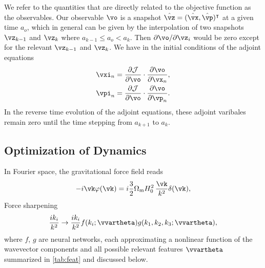 \documentclass[modern, trackchanges, dvipsnames]{aastex631}
\newcommand{\p}{\partial}
\newcommand{\cJ}{\mathcal{J}}
\newcommand{\Omegam}{\Omega_\mathrm{m}}
\begin{document}
We refer to the quantities that are directly related to the objective function
as the observables.
Our observable $\vo$ is a snapshot $\hat\vz = (\hat\vx,
\hat\vp)^\intercal$ at a given time $a_o$, which in general can be given by the
interpolation of two snapshots $\vz_{k-1}$ and $\vz_k$ where $a_{k-1} \leq a_o <
a_k$.
Then ${\p\vo}/{\p\vz_i}$ would be zero except for the relevant $\vz_{k-1}$
and $\vz_k$. We have in the initial conditions of the adjoint equations
\begin{align}
  \vxi_n &= \frac{\p\cJ}{\p\vo} \cdot \frac{\p\vo}{\p\vx_n}, \nonumber\\
  \vpi_n &= \frac{\p\cJ}{\p\vo} \cdot \frac{\p\vo}{\p\vp_n}.
\end{align}
In the reverse time evolution of the adjoint equations, these adjoint varibales
remain zero until the time stepping from $a_{k+1}$ to $a_k$.


\vspace{1em}
\subsection{Optimization of Dynamics}
\label{sec:so}

In Fourier space, the gravitational force field reads
\begin{equation}
- i \vk \varphi(\vk) = i \frac32 \Omegam H_0^2 \,\frac{\vk}{k^2} \delta(\vk),
\end{equation}
Force sharpening
%
\begin{equation}
\frac{i k_i}{k^2} \to \frac{i k_i}{k^2}
  f(k_i; \vvartheta) g(k_1, k_2, k_3; \vvartheta),
\end{equation}
%
where $f$, $g$ are neural networks, each approximating a nonlinear
function of the wavevector components and all possible relevant features
$\vvartheta$ summarized in \autoref{tab:feat} and discussed below.
\end{document}
